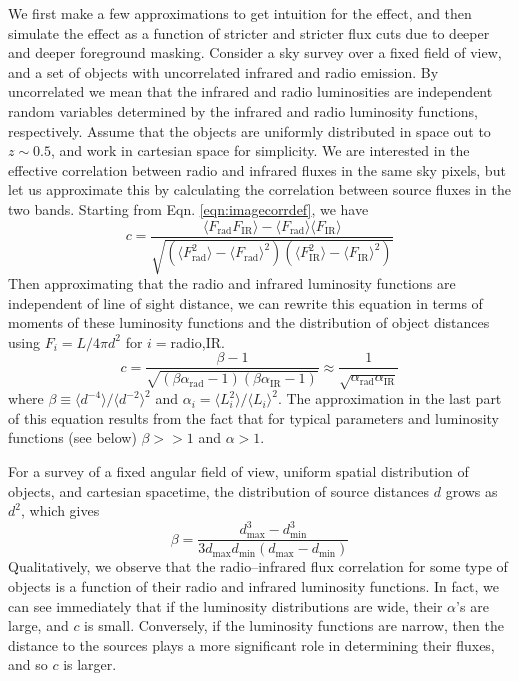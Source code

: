 \documentclass{emulateapj}
\newcommand{\mintext}{\text{min}}
\newcommand{\maxtext}{\text{max}}
\newcommand{\rad}{\text{rad}}
\newcommand{\ir}{\text{IR}}
\begin{document}
We first make a few approximations to get intuition for the effect, and then simulate the effect as a function of stricter and stricter flux cuts due to deeper and deeper foreground masking. Consider a sky survey over a fixed field of view, and a set of objects with uncorrelated infrared and radio emission. By uncorrelated we mean that the infrared and radio luminosities are independent random variables determined by the infrared and radio luminosity functions, respectively. Assume that the objects are uniformly distributed in space out to $z\sim0.5$, and work in cartesian space for simplicity. We are interested in the effective correlation between radio and infrared fluxes in the same sky pixels, but let us approximate this by calculating the correlation between source fluxes in the two bands. Starting from Eqn. \ref{eqn:imagecorrdef}, we have
\begin{equation} %
	c = \frac{\langle F_\rad F_\ir \rangle-\langle F_\rad\rangle\langle F_\ir\rangle}{\sqrt{(\langle F_\rad^2\rangle-\langle F_\rad\rangle^2)(\langle F_\ir^2\rangle-\langle F_\ir\rangle^2)}}
\end{equation}
Then approximating that the radio and infrared luminosity functions are independent of line of sight distance, we can rewrite this equation in terms of moments of these luminosity functions and the distribution of object distances using $F_i=L/4\pi d^2$ for $i=$radio,IR.
\begin{equation}
\label{eqn:cresult}
	c = \frac{\beta-1}{\sqrt{(\beta\alpha_\rad-1)(\beta\alpha_\ir-1)}}\approx\frac{1}{\sqrt{\alpha_\rad \alpha_\ir}}
\end{equation}
where $\beta\equiv\langle d^{-4}\rangle/\langle d^{-2}\rangle^2$ and $\alpha_i=\langle L_i^2\rangle/\langle L_i\rangle^2$. The approximation in the last part of this equation results from the fact that for typical parameters and luminosity functions (see below) $\beta>>1$ and $\alpha>1$. 

For a survey of a fixed angular field of view, uniform spatial distribution of objects, and cartesian spacetime, the distribution of source distances $d$ grows as $d^2$, which gives 
\begin{equation}
	\beta=\frac{d_\maxtext^3-d_\mintext^3}{3d_\maxtext d_\mintext (d_\maxtext-d_\mintext)}
\end{equation}
Qualitatively, we observe that the radio--infrared flux correlation for some type of objects is a function of their radio and infrared luminosity functions. In fact, we can see immediately that if the luminosity distributions are wide, their $\alpha$'s are large, and $c$ is small. Conversely, if the luminosity functions are narrow, then the distance to the sources plays a more significant role in determining their fluxes, and so $c$ is larger. 
\end{document}
